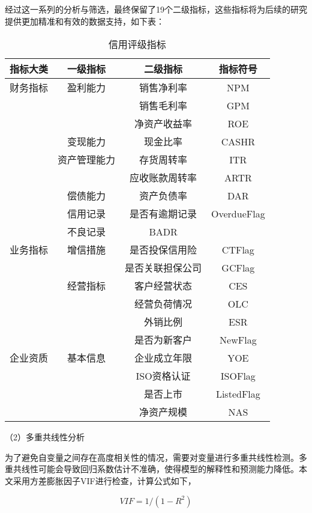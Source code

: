 	经过这一系列的分析与筛选，最终保留了19个二级指标，这些指标将为后续的研究提供更加精准和有效的数据支持，如下表：

\begin{table}[h]
	\caption{信用评级指标}
	\label{tab:papercomponents}
	\centering
	\begin{tabular}{cccc}
		\toprule
		{\bfseries 指标大类} & {\bfseries 一级指标} &  {\bfseries 二级指标} & {\bfseries 指标符号}  \\
		\midrule
		财务指标 & 盈利能力 &  销售净利率 & NPM \\
		& & 销售毛利率          &  GPM\\
		& & 净资产收益率 & ROE\\
		\midrule
		& 变现能力 & 现金比率      & CASHR\\
		\midrule   
		& 资产管理能力 & 存货周转率  & ITR \\
		&	& 应收账款周转率        & ARTR\\
		\midrule
		&偿债能力 & 资产负债率        & DAR\\
		\midrule
		& 信用记录 &  是否有逾期记录 & OverdueFlag \\
		& 不良记录          &  BADR\\
		\midrule
		业务指标&增信措施& 是否投保信用险        & CTFlag\\
		& & 是否关联担保公司        & GCFlag\\
		\midrule
		& 经营指标& 客户经营状态            & CES\\
		& & 经营负荷情况  & OLC \\
	   &	& 外销比例        & ESR\\
		& & 是否为新客户        & NewFlag\\
		\midrule
		企业资质&基本信息 &  企业成立年限 & YOE \\
		& & ISO资格认证         &  ISOFlag\\
		& & 是否上市 & ListedFlag \\
	& 	& 净资产规模        & NAS\\
		\bottomrule
	\end{tabular}
\end{table}
（2）多重共线性分析

为了避免自变量之间存在高度相关性的情况，需要对变量进行多重共线性检测。多重共线性可能会导致回归系数估计不准确，使得模型的解释性和预测能力降低。本文采用方差膨胀因子VIF进行检查，计算公式如下， 

\begin{equation}
	VIF =1/(1-R^2) 
\end{equation}

